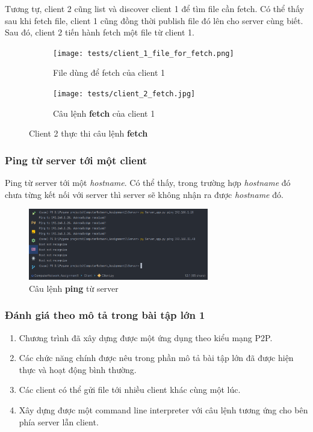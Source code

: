\documentclass[a4paper]{article}
\begin{document}
	\newpage
	Tương tự, client 2 cũng list và discover client 1 để tìm file cần fetch. Có thể thấy sau khi fetch file, client 1 cũng đồng thời publish file đó lên cho server cùng biết. Sau đó, client 2 tiến hành fetch một file từ client 1.
	\begin{figure}[h]
		\begin{center}
			\begin{subfigure}[b]{0.45\textwidth}
				\centering
				\texttt{[image: tests/client\_1\_file\_for\_fetch.png]}
				\hspace{\textwidth}
				\caption{File dùng để fetch của client 1}
			\end{subfigure}
			\begin{subfigure}[b]{0.45\textwidth}
				\centering
				\texttt{[image: tests/client\_2\_fetch.jpg]}
				\hspace{\textwidth}
				\caption{Câu lệnh \textbf{fetch} của client 1}
			\end{subfigure}
			\caption{Client 2 thực thi câu lệnh \textbf{fetch}}
		\end{center}
	\end{figure}
	\newpage
	\subsubsection{Ping từ server tới một client}
	Ping từ server tới một \textit{hostname}. Có thể thấy, trong trường hợp \textit{hostname} đó chưa từng kết nối với server thì server sẽ không nhận ra được \textit{hostname} đó.
	\begin{figure}[h]
		\begin{center}
			\includegraphics[width=0.7\textwidth]{tests/ping_command.png}
			\hspace{\textwidth}
			\caption{Câu lệnh \textbf{ping} từ server}
			\label{ping_command}
		\end{center}
	\end{figure}
	\subsubsection{Đánh giá theo mô tả trong bài tập lớn 1}
	\begin{enumerate}
		\item Chương trình đã xây dựng được một ứng dụng theo kiểu mạng P2P.
		\item Các chức năng chính được nêu trong phần mô tả bài tập lớn đã được hiện thực và hoạt động bình thường.
		\item Các client có thể gửi file tới nhiều client khác cùng một lúc.
		\item Xây dựng được một command line interpreter với câu lệnh tương ứng cho bên phía server lẫn client.
	\end{enumerate}
\end{document}
